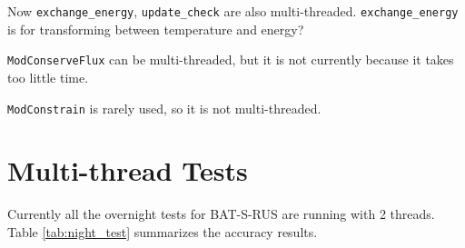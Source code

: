 \documentclass[11pt]{book} %
\begin{document}
Now \verb|exchange_energy|, \verb|update_check| are also multi-threaded. \verb|exchange_energy| is for transforming between temperature and energy?

\verb|ModConserveFlux| can be multi-threaded, but it is not currently because it takes too little time.

\verb|ModConstrain| is rarely used, so it is not multi-threaded.


\section{Multi-thread Tests}

Currently all the overnight tests for BAT-S-RUS are running with 2 threads. Table \ref{tab:night_test} summarizes the accuracy results.
\end{document}
